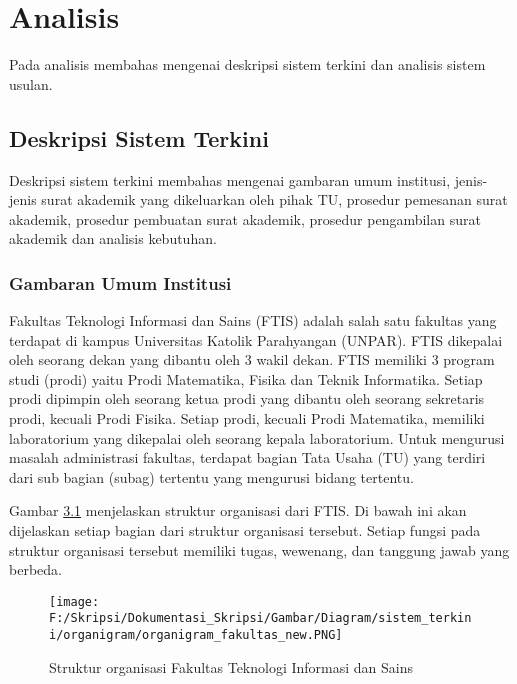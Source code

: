 \chapter{Analisis}
\label{chap:analisis}
Pada analisis membahas mengenai deskripsi sistem terkini dan analisis sistem usulan.

\section{Deskripsi Sistem Terkini}
\label{sec:deskripsi_sistem_terkini}
Deskripsi sistem terkini membahas mengenai gambaran umum institusi, jenis-jenis surat akademik yang dikeluarkan oleh pihak TU, prosedur pemesanan surat akademik, prosedur pembuatan surat akademik, prosedur pengambilan surat akademik dan analisis kebutuhan. \\

\subsection{Gambaran Umum Institusi}
\label{sec:gambaran_umum_institusi}
Fakultas Teknologi Informasi dan Sains (FTIS) adalah salah satu fakultas yang terdapat di kampus Universitas Katolik Parahyangan (UNPAR). FTIS dikepalai oleh seorang dekan yang dibantu oleh 3 wakil dekan. FTIS memiliki 3 program studi (prodi) yaitu Prodi Matematika, Fisika dan Teknik Informatika. Setiap prodi dipimpin oleh seorang ketua prodi yang dibantu oleh seorang sekretaris prodi, kecuali Prodi Fisika. Setiap prodi, kecuali Prodi Matematika, memiliki laboratorium yang dikepalai oleh seorang kepala laboratorium. Untuk mengurusi masalah administrasi fakultas, terdapat bagian Tata Usaha (TU) yang terdiri dari sub bagian (subag) tertentu yang mengurusi bidang tertentu.\

Gambar \hyperlink{organigram_fakultas}{3.1} menjelaskan struktur organisasi dari FTIS. Di bawah ini akan dijelaskan  setiap bagian dari struktur organisasi tersebut. Setiap fungsi pada struktur organisasi tersebut memiliki tugas, wewenang, dan tanggung jawab yang berbeda.
\begin{figure}[H]
	\centering
		\texttt{[image: F:/Skripsi/Dokumentasi\_Skripsi/Gambar/Diagram/sistem\_terkini/organigram/organigram\_fakultas\_new.PNG]}
	\caption{Struktur organisasi Fakultas Teknologi Informasi dan Sains}
	\label{fig:organigram_fakultas}
\end{figure}

